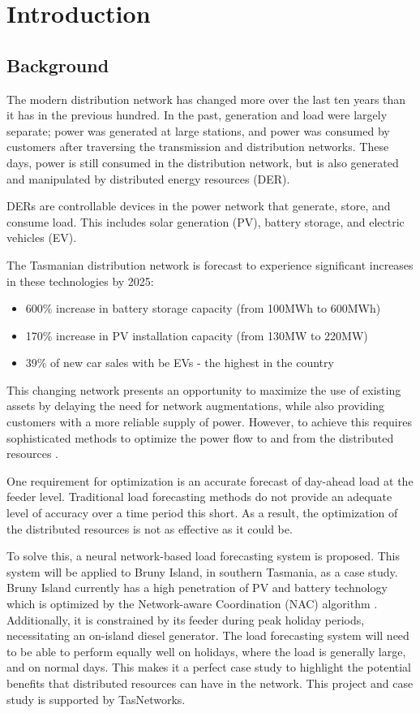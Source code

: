\chapter{Introduction}
\section{Background}
\par
The modern distribution network has changed more over the last ten years than it has in the previous hundred.
In the past, generation and load were largely separate; power was generated at large stations, and power was consumed by customers after traversing the transmission and distribution networks. 
These days, power is still consumed in the distribution network, but is also generated and manipulated by distributed energy resources (DER). 
\par
DERs are controllable devices in the power network that generate, store, and consume load. 
This includes solar generation (PV), battery storage, and electric vehicles (EV). 
\par
The Tasmanian distribution network is forecast to experience significant increases in these technologies by 2025: \\
\begin{itemize}
	\item 600\% increase in battery storage capacity (from 100MWh to 600MWh) \citep{Jacobs2017}
	\item 170\% increase in PV installation capacity (from 130MW to 220MW) \citep{Jacobs2017}
	\item 39\% of new car sales with be EVs - the highest in the country \citep{AEMO2016}
\end{itemize}

This changing network presents an opportunity to maximize the use of existing assets by delaying the need for network augmentations, while also providing customers with a more reliable supply of power.
However, to achieve this requires sophisticated methods to optimize the power flow to and from the distributed resources \cite{Scott2014}.
\par
One requirement for optimization is an accurate forecast of day-ahead load at the feeder level.
Traditional load forecasting methods do not provide an adequate level of accuracy over a time period this short.
As a result, the optimization of the distributed resources is not as effective as it could be.
\par
To solve this, a neural network-based load forecasting system is proposed.
This system will be applied to Bruny Island, in southern Tasmania, as a case study.
Bruny Island currently has a high penetration of PV and battery technology which is optimized by the Network-aware Coordination (NAC) algorithm \cite{Evan2016}.
Additionally, it is constrained by its feeder during peak holiday periods, necessitating an on-island diesel generator. The load forecasting system will need to be able to perform equally well on holidays, where the load is generally large, and on normal days. 
This makes it a perfect case study to highlight the potential benefits that distributed resources can have in the network.
This project and case study is supported by TasNetworks.


